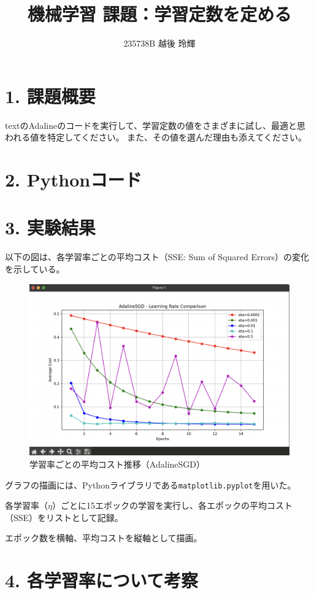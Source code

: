 \documentclass[a4paper,11pt,titlepage]{jsarticle}
\title{機械学習 課題：学習定数を定める}
\author{235738B 越後 玲輝}
\begin{document}
\maketitle

\section*{1. 課題概要}
textのAdalineのコードを実行して、学習定数の値をさまざまに試し、最適と思われる値を特定してください。  
また、その値を選んだ理由も添えてください。

\section*{2. Pythonコード}


\section*{3. 実験結果}
以下の図は、各学習率ごとの平均コスト（SSE: Sum of Squared Errors）の変化を示している。

\begin{figure}[H]
    \centering
    \includegraphics[width=0.8\linewidth]{eta_comparison.png}
    \caption{学習率ごとの平均コスト推移（AdalineSGD）}
\end{figure}

グラフの描画には、Pythonライブラリである\texttt{matplotlib.pyplot}を用いた。  

各学習率（$\eta$）ごとに15エポックの学習を実行し、各エポックの平均コスト（SSE）をリストとして記録。
  
エポック数を横軸、平均コストを縦軸として描画。 

\section*{4. 各学習率について考察}
\end{document}
